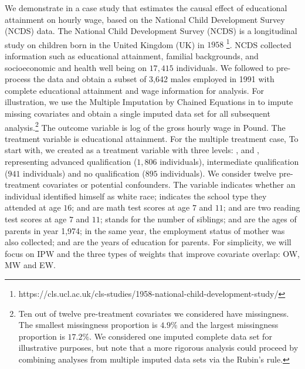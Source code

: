 We demonstrate  in a case study that estimates the causal effect of educational attainment on hourly wage, based on the National Child Development Survey (NCDS) data.  
The National Child Development Survey (NCDS) is a longitudinal study on children born in the United Kingdom (UK) in $1958$ \footnote{https://cls.ucl.ac.uk/cls-studies/1958-national-child-development-study/}. NCDS collected information such as educational attainment, familial backgrounds, and socioeconomic and health well being on $17,415$ individuals. We followed \citet{battistin2011misclassified} to pre-process the data and obtain a subset of 3,642 males employed in 1991 with complete educational attainment and wage information for analysis. For illustration, we use the Multiple Imputation by Chained Equations in \citep{buuren2010mice} to impute missing covariates and obtain a single imputed data set for all subsequent analysis.\footnote{Ten out of twelve pre-treatment covariates we considered have missingness. The smallest missingness proportion is $4.9\%$ and the largest missingness proportion is $17.2\%$. We considered one imputed complete data set for illustrative purposes, but note that a more rigorous analysis could proceed by combining analyses from multiple imputed data sets via the Rubin's rule.} The outcome variable  is log of the gross hourly wage in Pound. The treatment variable is educational attainment.  
For the multiple treatment case, 
To start with, we created  as a treatment variable with three levels: ,  and , representing advanced qualification ($1,806$ individuals), intermediate qualification ($941$ individuals) and no qualification ($895$ individuals). We consider twelve pre-treatment covariates or potential confounders. The variable  indicates whether an individual identified himself as white race;  indicates the school type they attended at age $16$;  and  are math test scores at age $7$ and $11$;   and  are two reading test scores at age $7$ and $11$;  stands for the number of siblings;  and  are the ages of parents in year 1,974; in the same year, the employment status of mother  was also collected;  and  are the years of education for parents. For simplicity, we will focus on IPW and the three types of weights that improve covariate overlap: OW, MW and EW. %
 


